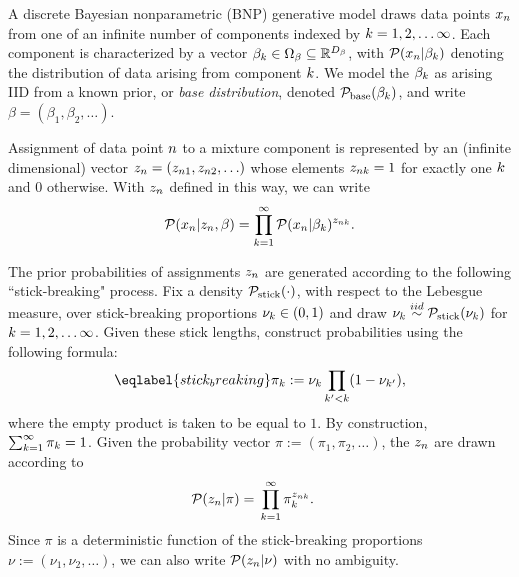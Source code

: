 A discrete Bayesian nonparametric (BNP) generative model
draws data points $x_n$ from one of an infinite number of components indexed by
$k = 1, 2, \ldots \infty$.
Each component is characterized by a vector $\beta_k \in \Omega_{\beta} \subseteq
\mathbb{R}^{{D_{\beta}}}$, with $\mathcal{P}(x_n \vert \beta_k)$ denoting the
distribution of data arising from  component $k$.
We model the $\beta_k$
as arising IID from a known prior, or \textit{base distribution}, denoted
$\mathcal{P}_{\mathrm{base}}(\beta_k)$, and write
$\beta = (\beta_1, \beta_2, \ldots)$.

Assignment of data point $n$ to a mixture component is represented by an
(infinite dimensional) vector $z_n = (z_{n1}, z_{n2}, \ldots)$
whose elements $z_{nk} = 1$ for exactly one $k$ and $0$ otherwise.
With $z_n$ defined in this way, we can write
%
\begin{align*}
%
\p(\x_n \vert \z_\n, \beta) =
    \prod_{k=1}^\infty \p(\x_n \vert \beta_\k)^{\z_{\n\k}}.
%
\end{align*}


The prior probabilities of assignments $z_{n}$ are generated according
to the following ``stick-breaking" process.
Fix a density $\mathcal{P}_{\mathrm{stick}}(\cdot)$, with respect to the
Lebesgue measure, over stick-breaking proportions $\nu_{k} \in (0, 1)$ and
draw $\nu_{k}\overset{iid}{\sim}\mathcal{P}_{\mathrm{stick}}(\nu_{k})$ for $k=1,2,\ldots\infty$.
Given these stick lengths, construct probabilities using the following formula:
%
\begin{align}\eqlabel{stick_breaking}
%
\pi_\k := \nuk \prod_{\k' < \k} (1 - \nu_{\k'}),
%
\end{align}
%
where the empty product is taken to be equal to $1$.
By construction, $\sum_{k=1}^{\infty} \pi_k = 1$.
Given the probability vector $\pi := (\pi_1, \pi_2, \ldots)$,
the $z_n$ are drawn according to
%
\begin{align*}
%
\p(\z_\n \vert \pi) ={}&
   \prod_{k=1}^{\infty} \pi_\k^{\z_{\n\k}}.
%
\end{align*}
%
Since $\pi$ is a deterministic function of the stick-breaking proportions
$\nu := (\nu_1, \nu_2, \ldots)$,
we can also write
$\mathcal{P}(z_n \vert \nu)$ with no ambiguity.

